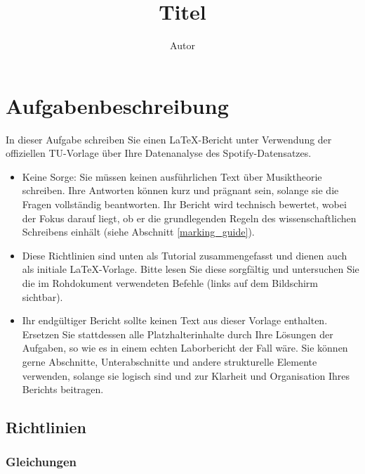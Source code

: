 \documentclass[
	german,
	accentcolor=9c,%
	type=intern,
	marginpar=false
	]{tudapub}
\begin{document}
\title{Titel}
\author{Autor}

\maketitle

\tableofcontents

\newpage

\section{Aufgabenbeschreibung}
In dieser Aufgabe schreiben Sie einen LaTeX-Bericht unter Verwendung der offiziellen TU-Vorlage über Ihre Datenanalyse des Spotify-Datensatzes. 

\begin{itemize}
\item Keine Sorge: Sie müssen keinen ausführlichen Text über Musiktheorie schreiben. Ihre Antworten können kurz und prägnant sein, solange sie die Fragen vollständig beantworten. Ihr Bericht wird technisch bewertet, wobei der Fokus darauf liegt, ob er die grundlegenden Regeln des wissenschaftlichen Schreibens einhält (siehe Abschnitt \ref{marking_guide}). 

\item Diese Richtlinien sind unten als Tutorial zusammengefasst und dienen auch als initiale LaTeX-Vorlage. Bitte lesen Sie diese sorgfältig und untersuchen Sie die im Rohdokument verwendeten Befehle (links auf dem Bildschirm sichtbar).

\item Ihr endgültiger Bericht sollte keinen Text aus dieser Vorlage enthalten. Ersetzen Sie stattdessen alle Platzhalterinhalte durch Ihre Lösungen der Aufgaben, so wie es in einem echten Laborbericht der Fall wäre. Sie können gerne Abschnitte, Unterabschnitte und andere strukturelle Elemente verwenden, solange sie logisch sind und zur Klarheit und Organisation Ihres Berichts beitragen.
\end{itemize}


\subsection{Richtlinien}       %

\subsubsection{Gleichungen}  %
\end{document}
